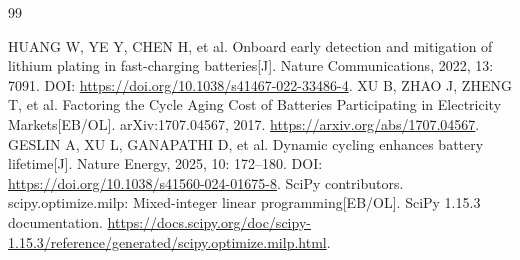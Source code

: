 \begin{thebibliography}{99}
\raggedright
{}
HUANG W, YE Y, CHEN H, et al.
Onboard early detection and mitigation of lithium plating in fast-charging batteries[J].
Nature Communications, 2022, 13: 7091.
DOI: \url{https://doi.org/10.1038/s41467-022-33486-4}.
XU B, ZHAO J, ZHENG T, et al.
Factoring the Cycle Aging Cost of Batteries Participating in Electricity Markets[EB/OL].
arXiv:1707.04567, 2017.
\url{https://arxiv.org/abs/1707.04567}.
GESLIN A, XU L, GANAPATHI D, et al.
Dynamic cycling enhances battery lifetime[J].
Nature Energy, 2025, 10: 172--180.
DOI: \url{https://doi.org/10.1038/s41560-024-01675-8}.
SciPy contributors. scipy.optimize.milp: Mixed-integer linear programming[EB/OL].
SciPy 1.15.3 documentation.
\url{https://docs.scipy.org/doc/scipy-1.15.3/reference/generated/scipy.optimize.milp.html}.
\end{thebibliography}
